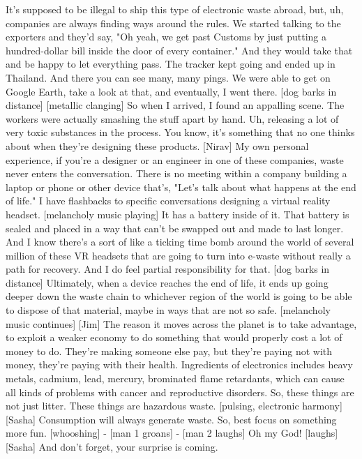\documentclass[a4paper]{article}
\begin{document}
	It's supposed to be illegal to ship this type of electronic waste abroad,
	but, uh, companies are always finding ways around the rules.
	We started talking to the exporters and they'd say,
	"Oh yeah, we get past Customs by just putting a hundred-dollar bill
	inside the door of every container."
	And they would take that and be happy to let everything pass.
	The tracker kept going
	and ended up in Thailand.
	And there you can see many, many pings.
	We were able to get on Google Earth,
	take a look at that, and eventually, I went there.
	[dog barks in distance]
	[metallic clanging]
	So when I arrived, I found an appalling scene.
	The workers were actually smashing the stuff apart by hand.
	Uh, releasing a lot of very toxic substances in the process.
	You know, it's something that no one thinks about
	when they're designing these products.
	[Nirav] My own personal experience,
	if you're a designer or an engineer in one of these companies,
	waste never enters the conversation.
	There is no meeting within a company building a laptop
	or phone or other device
	that's, "Let's talk about what happens at the end of life."
	I have flashbacks to specific conversations
	designing a virtual reality headset.
	[melancholy music playing]
	It has a battery inside of it.
	That battery is sealed and placed in a way
	that can't be swapped out and made to last longer.
	And I know there's a sort of like a ticking time bomb
	around the world of several million of these VR headsets
	that are going to turn into e-waste without really a path for recovery.
	And I do feel partial responsibility for that.
	[dog barks in distance]
	Ultimately, when a device reaches the end of life,
	it ends up going deeper down the waste chain to whichever
	region of the world is going to be able to
	dispose of that material, maybe in ways that are not so safe.
	[melancholy music continues]
	[Jim] The reason it moves across the planet
	is to take advantage, to exploit a weaker economy
	to do something that would properly cost a lot of money to do.
	They're making someone else pay,
	but they're paying not with money, they're paying with their health.
	Ingredients of electronics includes heavy metals,
	cadmium, lead, mercury,
	brominated flame retardants, which can cause all kinds of problems
	with cancer and reproductive disorders.
	So, these things are not just litter. These things are hazardous waste.
	[pulsing, electronic harmony]
	[Sasha] Consumption will always generate waste.
	So, best focus on something more fun.
	[whooshing]
	- [man 1 groans] - [man 2 laughs]
	Oh my God! [laughs]
	[Sasha] And don't forget, your surprise is coming.
\end{document}
